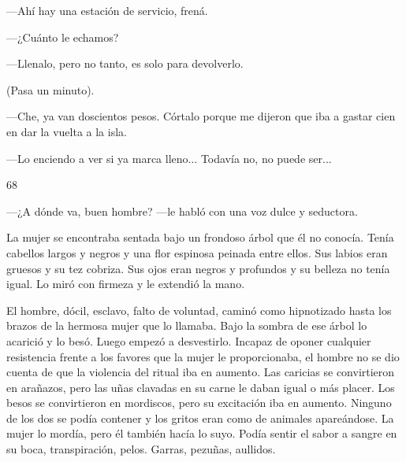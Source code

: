 \documentclass[12pt,twoside,openright,a5paper]{book}
\begin{document}
\vspace{0.5cm}

\nopagebreak

---Ahí hay una estación de servicio, frená.

---¿Cuánto le echamos?

---Llenalo, pero no tanto, es solo para devolverlo.

(Pasa un minuto).

---Che, ya van doscientos pesos. Córtalo porque me dijeron que iba a gastar cien en
dar la vuelta a la isla.

---Lo enciendo a ver si ya marca lleno... Todavía no,
no puede ser...

\vspace{0.5cm}

\hrulefill \hspace{0.1cm}\decofourleft\hspace{0.2cm} 68 \hspace{0.2cm}\decofourright \hspace{0.1cm}\hrulefill

\nopagebreak

\vspace{0.5cm}

\nopagebreak

---¿A dónde va, buen hombre? ---le habló con una voz dulce y seductora.

La mujer se encontraba sentada bajo un frondoso árbol que él no
conocía. Tenía cabellos largos y negros y una flor espinosa peinada entre
ellos. Sus labios eran gruesos y su tez cobriza. Sus ojos eran negros y
profundos y su belleza no tenía igual. Lo miró con firmeza y le extendió
la mano.

El hombre, dócil, esclavo, falto de voluntad, caminó como hipnotizado hasta
los brazos de la hermosa mujer que lo llamaba. Bajo la sombra de ese árbol
lo acarició y lo besó. Luego empezó a desvestirlo. Incapaz de oponer
cualquier resistencia frente a los favores que la mujer le proporcionaba,
el hombre no se dio cuenta de que la violencia del ritual iba en aumento. Las
caricias se convirtieron en arañazos, pero las uñas clavadas en su carne
le daban igual o más placer. Los besos se convirtieron en mordiscos, pero
su excitación iba en aumento. Ninguno de los dos se podía contener y
los gritos eran como de animales apareándose. La mujer lo mordía, pero
él también hacía lo suyo. Podía sentir el sabor a sangre en su boca,
transpiración, pelos. Garras, pezuñas, aullidos.
\end{document}
